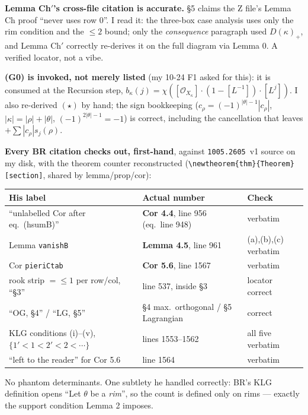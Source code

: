 \documentclass[11pt,a4paper]{article}
\theoremstyle{remark}
\newcommand{\Dg}{D}
\begin{document}
\textbf{Lemma Ch$'$'s cross-file citation is accurate.} \S5 claims the Z file's Lemma Ch proof
``never uses row 0''. I read it: the three-box case analysis uses only the rim condition and the
$\le2$ bound; only the \emph{consequence} paragraph used $\Dg(\kappa)_+$, and Lemma Ch$'$
correctly re-derives it on the full diagram via Lemma 0. A verified locator, not a vibe.

\textbf{(G0) is invoked, not merely listed} (my 10-24 F1 asked for this): it is consumed at the
Recursion step, $b_\kappa(j)=\chi([\mathcal O_{X_\kappa}]\cdot(1-[L^{-1}])\cdot[L^j])$. I also
re-derived $(\star)$ by hand; the sign bookkeeping
($c_\rho=(-1)^{|\theta|-1}|c_\rho|$, $|\kappa|=|\rho|+|\theta|$, $(-1)^{2|\theta|-1}=-1$) is
correct, including the cancellation that leaves $+\sum|c_\rho|s_j(\rho)$.

\textbf{Every BR citation checks out, first-hand}, against \texttt{1005.2605}~v1 source on my
disk, with the theorem counter reconstructed (\verb|\newtheorem{thm}{Theorem}[section]|, shared
by lemma/prop/cor):

\begin{center}
\small
\begin{tabular}{p{5.0cm}p{4.0cm}p{3.6cm}}
\toprule
\textbf{His label} & \textbf{Actual number} & \textbf{Check} \\
\midrule
``unlabelled Cor after eq.\ (hsumB)'' & \textbf{Cor 4.4}, line 956 (eq.\ line 948) & verbatim \\
Lemma \texttt{vanishB} & \textbf{Lemma 4.5}, line 961 & (a),(b),(c) verbatim \\
Cor \texttt{pieriCtab} & \textbf{Cor 5.6}, line 1567 & verbatim \\
rook strip $=\le1$ per row/col, ``\S3'' & line 537, inside \S3 & locator correct \\
``OG, \S4'' / ``LG, \S5'' & \S4 max.\ orthogonal / \S5 Lagrangian & correct \\
KLG conditions (i)--(v), $\{1'{<}1{<}2'{<}2{<}\cdots\}$ & lines 1553--1562 & all five verbatim \\
``left to the reader'' for Cor 5.6 & line 1564 & verbatim \\
\bottomrule
\end{tabular}
\end{center}

\noindent No phantom determinants. One subtlety he handled correctly: BR's KLG definition opens
``Let $\theta$ be a \emph{rim}'', so the count is defined only on rims --- exactly the support
condition Lemma 2 imposes.
\end{document}
